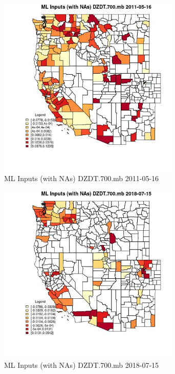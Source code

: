 \begin{figure} 
\centering  
\includegraphics[width=0.77\textwidth]{Code_Outputs/Report_ML_input_PM25_Step4_part_e_de_duplicated_aves_compiled_2019-05-21wNAs_CountyDZDT700mbMean2011-05-16.jpg} 
\caption{\label{fig:Report_ML_input_PM25_Step4_part_e_de_duplicated_aves_compiled_2019-05-21wNAsCountyDZDT700mbMean2011-05-16}ML Inputs (with NAs) DZDT.700.mb 2011-05-16} 
\end{figure} 
 

\begin{figure} 
\centering  
\includegraphics[width=0.77\textwidth]{Code_Outputs/Report_ML_input_PM25_Step4_part_e_de_duplicated_aves_compiled_2019-05-21wNAs_CountyDZDT700mbMean2018-07-15.jpg} 
\caption{\label{fig:Report_ML_input_PM25_Step4_part_e_de_duplicated_aves_compiled_2019-05-21wNAsCountyDZDT700mbMean2018-07-15}ML Inputs (with NAs) DZDT.700.mb 2018-07-15} 
\end{figure} 
 

